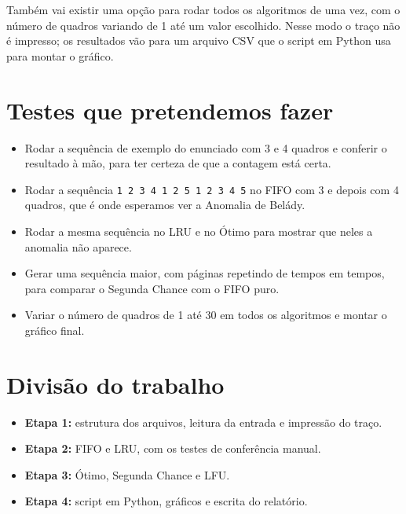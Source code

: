 \documentclass[12pt]{article}
\begin{document}
Também vai existir uma opção para rodar todos os algoritmos de uma vez, com o
número de quadros variando de 1 até um valor escolhido. Nesse modo o traço não é
impresso; os resultados vão para um arquivo CSV que o script em Python usa para
montar o gráfico.

\section{Testes que pretendemos fazer}
\label{sec:testes}

\begin{itemize}
    \item Rodar a sequência de exemplo do enunciado com 3 e 4 quadros e conferir
    o resultado à mão, para ter certeza de que a contagem está certa.
    \item Rodar a sequência \texttt{1 2 3 4 1 2 5 1 2 3 4 5} no FIFO com 3 e
    depois com 4 quadros, que é onde esperamos ver a Anomalia de Belády.
    \item Rodar a mesma sequência no LRU e no Ótimo para mostrar que neles a
    anomalia não aparece.
    \item Gerar uma sequência maior, com páginas repetindo de tempos em tempos,
    para comparar o Segunda Chance com o FIFO puro.
    \item Variar o número de quadros de 1 até 30 em todos os algoritmos e montar
    o gráfico final.
\end{itemize}

\section{Divisão do trabalho}
\label{sec:divisao}

\begin{itemize}
    \item \textbf{Etapa 1:} estrutura dos arquivos, leitura da entrada e
    impressão do traço.
    \item \textbf{Etapa 2:} FIFO e LRU, com os testes de conferência manual.
    \item \textbf{Etapa 3:} Ótimo, Segunda Chance e LFU.
    \item \textbf{Etapa 4:} script em Python, gráficos e escrita do relatório.
\end{itemize}



\end{document}
